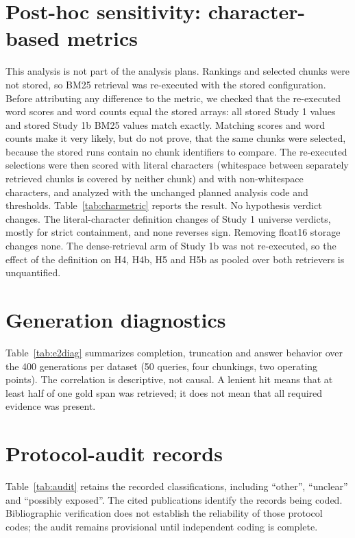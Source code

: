 \documentclass[11pt]{article}
\begin{document}
\FloatBarrier
\section{Post-hoc sensitivity: character-based metrics}\label{app:charmetric}
This analysis is not part of the analysis plans. Rankings and selected chunks were not stored, so BM25 retrieval was re-executed with the stored configuration. Before attributing any difference to the metric, we checked that the re-executed word scores and word counts equal the stored arrays: all \PosthocEquivElements{} stored Study 1 values and \PosthocEquivElementsB{} stored Study 1b BM25 values match exactly. Matching scores and word counts make it very likely, but do not prove, that the same chunks were selected, because the stored runs contain no chunk identifiers to compare. The re-executed selections were then scored with literal characters (whitespace between separately retrieved chunks is covered by neither chunk) and with non-whitespace characters, and analyzed with the unchanged planned analysis code and thresholds. Table~\ref{tab:charmetric} reports the result. No hypothesis verdict changes. The literal-character definition changes \PosthocCharFlips{} of \PosthocUniverses{} Study 1 universe verdicts, mostly for strict containment, and none reverses sign. Removing float16 storage changes none. The dense-retrieval arm of Study 1b was not re-executed, so the effect of the definition on H4, H4b, H5 and H5b as pooled over both retrievers is unquantified.


\FloatBarrier
\section{Generation diagnostics}\label{app:diagnostics}
Table~\ref{tab:e2diag} summarizes completion, truncation and answer behavior over the 400 generations per dataset (50 queries, four chunkings, two operating points). The correlation is descriptive, not causal. A lenient hit means that at least half of one gold span was retrieved; it does not mean that all required evidence was present.


\clearpage
\section{Protocol-audit records}\label{app:audit}
Table~\ref{tab:audit} retains the recorded classifications, including ``other'', ``unclear'' and ``possibly exposed''. The cited publications identify the records being coded. Bibliographic verification does not establish the reliability of those protocol codes; the audit remains provisional until independent coding is complete.

\FloatBarrier
\end{document}

